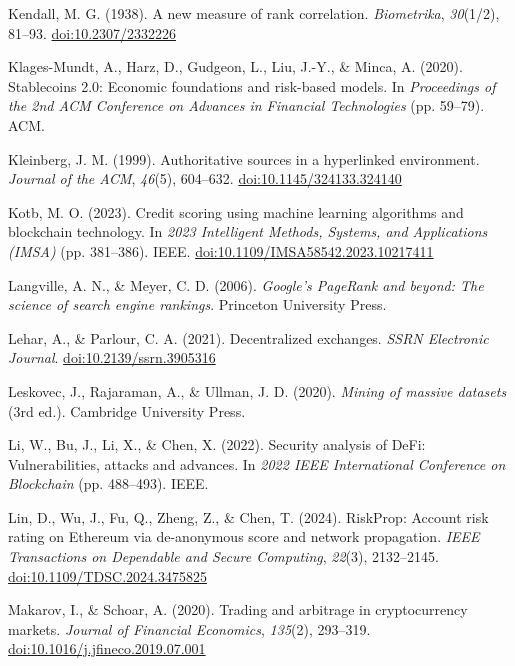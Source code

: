 \begin{enumerate}[label={[\arabic*]}, leftmargin=*, itemsep=0.35em, parsep=0pt]
  \item{}\label{ref:36} Kendall, M. G. (1938). A new measure of rank correlation. \textit{Biometrika}, \textit{30}(1/2), 81--93. \href{https://doi.org/10.2307/2332226}{doi:10.2307/2332226}
  \item{}\label{ref:37} Klages-Mundt, A., Harz, D., Gudgeon, L., Liu, J.-Y., \& Minca, A. (2020). Stablecoins 2.0: Economic foundations and risk-based models. In \textit{Proceedings of the 2nd ACM Conference on Advances in Financial Technologies} (pp. 59--79). ACM.
  \item{}\label{ref:38} Kleinberg, J. M. (1999). Authoritative sources in a hyperlinked environment. \textit{Journal of the ACM}, \textit{46}(5), 604--632. \href{https://doi.org/10.1145/324133.324140}{doi:10.1145/324133.324140}
  \item{}\label{ref:39} Kotb, M. O. (2023). Credit scoring using machine learning algorithms and blockchain technology. In \textit{2023 Intelligent Methods, Systems, and Applications (IMSA)} (pp. 381--386). IEEE. \href{https://doi.org/10.1109/IMSA58542.2023.10217411}{doi:10.1109/IMSA58542.2023.10217411}
  \item{}\label{ref:40} Langville, A. N., \& Meyer, C. D. (2006). \textit{Google's PageRank and beyond: The science of search engine rankings}. Princeton University Press.
  \item{}\label{ref:41} Lehar, A., \& Parlour, C. A. (2021). Decentralized exchanges. \textit{SSRN Electronic Journal}. \href{https://doi.org/10.2139/ssrn.3905316}{doi:10.2139/ssrn.3905316}
  \item{}\label{ref:42} Leskovec, J., Rajaraman, A., \& Ullman, J. D. (2020). \textit{Mining of massive datasets} (3rd ed.). Cambridge University Press.
  \item{}\label{ref:43} Li, W., Bu, J., Li, X., \& Chen, X. (2022). Security analysis of DeFi: Vulnerabilities, attacks and advances. In \textit{2022 IEEE International Conference on Blockchain} (pp. 488--493). IEEE.
  \item{}\label{ref:44} Lin, D., Wu, J., Fu, Q., Zheng, Z., \& Chen, T. (2024). RiskProp: Account risk rating on Ethereum via de-anonymous score and network propagation. \textit{IEEE Transactions on Dependable and Secure Computing}, \textit{22}(3), 2132--2145. \href{https://doi.org/10.1109/TDSC.2024.3475825}{doi:10.1109/TDSC.2024.3475825}
  \item{}\label{ref:45} Makarov, I., \& Schoar, A. (2020). Trading and arbitrage in cryptocurrency markets. \textit{Journal of Financial Economics}, \textit{135}(2), 293--319. \href{https://doi.org/10.1016/j.jfineco.2019.07.001}{doi:10.1016/j.jfineco.2019.07.001}

\end{enumerate}
